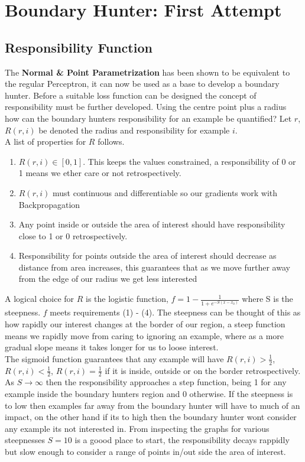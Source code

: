 \documentclass[notitlepage]{report}
\theoremstyle{definition}
\begin{document}
\chapter{Boundary Hunter: First Attempt}
\section{Responsibility Function}
The \textbf{Normal \& Point Parametrization} has been shown to be equivalent to the regular Perceptron, it can now be used as a base to develop a boundary hunter. Before a suitable loss function can be designed the concept of responsibility must be further developed. Using the centre point plus a radius how can the boundary hunters responsibility for an example be quantified? Let $r$, $R(r, i)$ be denoted the radius and responsibility for example $i$.\\

A list of properties for $R$ follows.

\begin{enumerate}
	\item $R(r, i) \in [0, 1]$. This keeps the values constrained, a responsibility of 0 or 1 means we ether care or not retrospectively.
	\item $R(r, i)$ must continuous and differentiable so our gradients work with Backpropagation
	\item Any point inside or outside the area of interest should have responsibility close to 1 or 0 retrospectively.
	\item Responsibility for points outside the area of interest should decrease as distance from area increases, this guarantees that as we move further away from the edge of our radius we get less interested
\end{enumerate}

A logical choice for $R$ is the logistic function, $f = 1 - \frac{1}{1 + e^{-S(x - x_0)}}$ where S is the steepness. $f$ meets requirements (1) - (4). The steepness can be thought of this as how rapidly our interest changes at the border of our region, a steep function means we rapidly move from caring to ignoring an example, where as a more gradual slope means it takes longer for us to loose interest.\\

The sigmoid function guarantees that any example will have $R(r, i) > \frac{1}{2}$, $R(r, i) < \frac{1}{2}$, $R(r, i) = \frac{1}{2}$ if it is inside, outside or on the border retrospectively. As $S \rightarrow \infty$ then the responsibility approaches a step function, being 1 for any example inside the boundary hunters region and 0 otherwise. If the steepness is to low then examples far away from the boundary hunter will have to much of an impact, on the other hand if its to high then the boundary hunter wont consider any example its not interested in. From inspecting the graphs for various steepnesses $S = 10$ is a goood place to start, the responsibility decays rappidly but slow enough to consider a range of points in/out side the area of interest.
\end{document}
